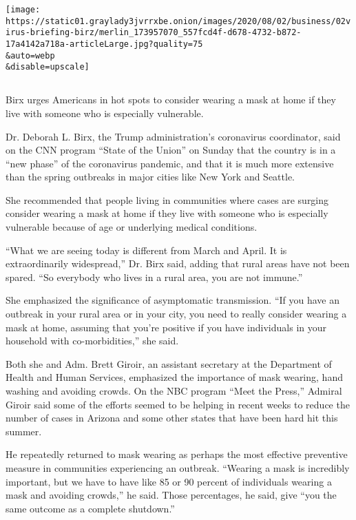 \texttt{[image: https://static01.graylady3jvrrxbe.onion/images/2020/08/02/business/02virus-briefing-birz/merlin\_173957070\_557fcd4f-d678-4732-b872-17a4142a718a-articleLarge.jpg?quality=75\\\&auto=webp\\\&disable=upscale]}

\subsection{}

Birx urges Americans in hot spots to consider wearing a mask at home if
they live with someone who is especially vulnerable.

Dr. Deborah L. Birx, the Trump administration's coronavirus coordinator,
said on the CNN program ``State of the Union'' on Sunday that the
country is in a ``new phase'' of the coronavirus pandemic, and that it
is much more extensive than the spring outbreaks in major cities like
New York and Seattle.

She recommended that people living in communities where cases are
surging consider wearing a mask at home if they live with someone who is
especially vulnerable because of age or underlying medical conditions.

``What we are seeing today is different from March and April. It is
extraordinarily widespread,'' Dr. Birx said, adding that rural areas
have not been spared. ``So everybody who lives in a rural area, you are
not immune.''

She emphasized the significance of asymptomatic transmission. ``If you
have an outbreak in your rural area or in your city, you need to really
consider wearing a mask at home, assuming that you're positive if you
have individuals in your household with co-morbidities,'' she said.

Both she and Adm. Brett Giroir, an assistant secretary at the Department
of Health and Human Services, emphasized the importance of mask wearing,
hand washing and avoiding crowds. On the NBC program ``Meet the Press,''
Admiral Giroir said some of the efforts seemed to be helping in recent
weeks to reduce the number of cases in Arizona and some other states
that have been hard hit this summer.

He repeatedly returned to mask wearing as perhaps the most effective
preventive measure in communities experiencing an outbreak. ``Wearing a
mask is incredibly important, but we have to have like 85 or 90 percent
of individuals wearing a mask and avoiding crowds,'' he said. Those
percentages, he said, give ``you the same outcome as a complete
shutdown.''

